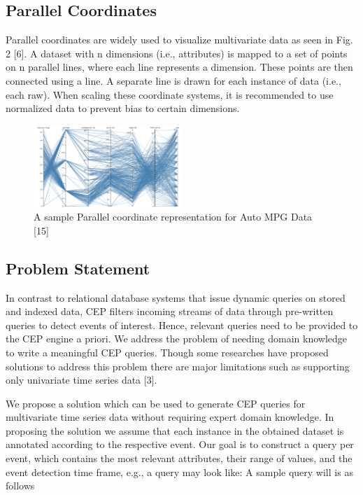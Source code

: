 \documentclass[letterpaper, 10 pt, conference]{IEEEtran}  %
\begin{document}
\subsection{Parallel Coordinates}

Parallel coordinates are widely used to visualize multivariate data as seen in Fig. 2 [6]. A dataset with n dimensions (i.e., attributes) is mapped to a set of points on n parallel lines, where each line represents a dimension. These points are then connected using a line. A separate line is drawn for each instance of data (i.e., each raw). When scaling these coordinate systems, it is recommended to use normalized data to prevent bias to certain dimensions.
\begin{figure}[h!]
\includegraphics[width=0.5\textwidth]{parrelel.png}
\caption{A sample Parallel coordinate representation for Auto MPG Data [15]}
\end{figure}
 

\subsection{Problem Statement} 
In contrast to relational database systems that issue dynamic queries on stored and indexed data, CEP filters incoming streams of data through pre-written queries to detect events of interest. Hence, relevant queries need to be provided to the CEP engine a priori. We address the problem of needing domain knowledge to write a meaningful CEP queries. Though some researches have proposed solutions to address this problem there are major limitations such as supporting only univariate time series data [3]. 

We propose a solution which can be used to generate CEP queries for multivariate time series data without requiring expert domain knowledge. In proposing the solution we assume that each instance in the obtained dataset is annotated according to the respective event. Our goal is to construct a query per event, which contains the most relevant attributes, their range of values, and the event detection time frame, e.g., a query may look like:  A sample query will is as follows
\end{document}
